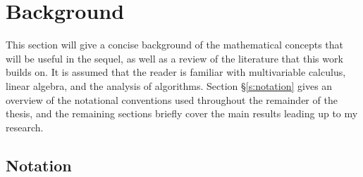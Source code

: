\chapter{Background}\label{c:background}
This section will give a concise background of the mathematical
concepts that will be useful in the sequel, as well as a review of the
literature that this work builds on. It is assumed that the reader is
familiar with multivariable calculus, linear algebra, and the analysis
of algorithms. Section \S\ref{s:notation} gives an overview of the
notational conventions used throughout the remainder of the thesis,
and the remaining sections briefly cover the main results leading up
to my research.

\section*{Notation}\label{s:notation}

